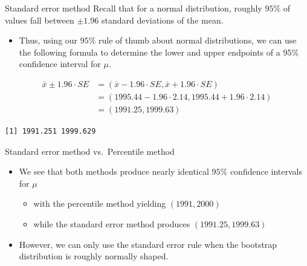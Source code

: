 \documentclass[
  ignorenonframetext,
]{beamer}
\newenvironment{Shaded}{\begin{snugshade}}{\end{snugshade}}
\newcommand{\DecValTok}[1]{\textcolor[rgb]{0.00,0.00,0.81}{#1}}
\newcommand{\FunctionTok}[1]{\textcolor[rgb]{0.13,0.29,0.53}{\textbf{#1}}}
\newcommand{\NormalTok}[1]{#1}
\newcommand{\SpecialCharTok}[1]{\textcolor[rgb]{0.81,0.36,0.00}{\textbf{#1}}}
\providecommand{\tightlist}{%
  \setlength{\itemsep}{0pt}\setlength{\parskip}{0pt}}
\begin{document}
\begin{frame}[fragile]{Standard error method}
\label{standard-error-method-2}
Recall that for a normal distribution, roughly \(95\%\) of values fall
between \(\pm1.96\) standard deviations of the mean.

\begin{itemize}
\tightlist
\item
  Thus, using our \(95\%\) rule of thumb about normal distributions, we
  can use the following formula to determine the lower and upper
  endpoints of a 95\% confidence interval for \(\mu\).
\end{itemize}

\[\begin{array}{ll}
\bar{x}\pm1.96\cdot SE&=(\bar{x}-1.96\cdot SE, \bar{x}+1.96\cdot SE)\\
&=(1995.44-1.96\cdot 2.14, 1995.44+1.96\cdot2.14)\\
&=(1991.25,1999.63)
\end{array}\]

\begin{Shaded}
\end{Shaded}

\begin{verbatim}
[1] 1991.251 1999.629
\end{verbatim}
\end{frame}

\begin{frame}{Standard error method vs.~Percentile method}
\label{standard-error-method-vs.-percentile-method}
\begin{itemize}
\item
  We see that both methods produce nearly identical \(95\%\) confidence
  intervals for \(\mu\)

  \begin{itemize}
  \tightlist
  \item
    with the percentile method yielding \((1991, 2000)\)
  \item
    while the standard error method produces \((1991.25, 1999.63)\)
  \end{itemize}
\item
  However, we can only use the standard error rule when the bootstrap
  distribution is roughly normally shaped.
\end{itemize}
\end{frame}
\end{document}
